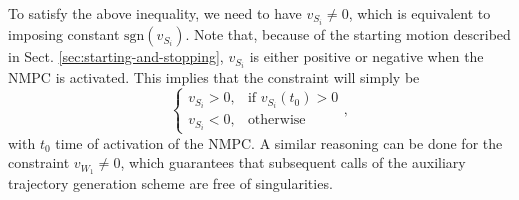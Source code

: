 To satisfy the above inequality, we need to have $v_{S_i} \ne 0$, which is
equivalent to imposing constant $\mathrm{sgn}(v_{S_i})$. Note that, because of
the starting motion described in Sect. \ref{sec:starting-and-stopping},
$v_{S_i}$ is either positive or negative when the NMPC is activated.
This implies that the constraint will simply be
\begin{equation*}
\begin{cases}
    v_{S_i} > 0, & \text{if $v_{S_i}(t_0)>0$} \\
    v_{S_i} < 0, & \text{otherwise}
\end{cases},
\end{equation*}
with $t_0$ time of activation of the NMPC. A similar reasoning can be done
for the constraint $v_{W_1} \ne 0$, which guarantees that subsequent calls of
the auxiliary trajectory generation scheme are free of singularities.

